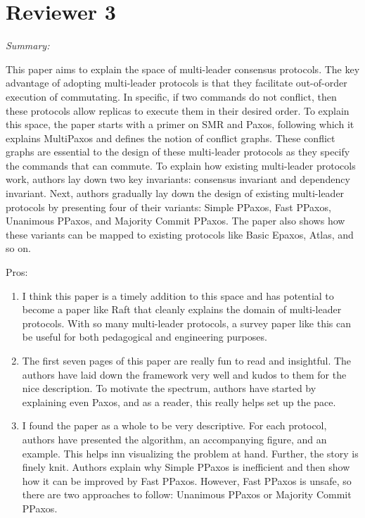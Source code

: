 \documentclass[letterpaper,twocolumn,10pt]{article}
\newenvironment{reviewerquote}
{\list{}{\leftmargin=\parindent\rightmargin=0in}\item[] \itshape \color{ReviewerDarkGray}}%
{\endlist}
\begin{document}
\section*{Reviewer 3}
\begin{reviewerquote}
  Summary:

  This paper aims to explain the space of multi-leader consensus protocols. The
  key advantage of adopting multi-leader protocols is that they facilitate
  out-of-order execution of commutating. In specific, if two commands do not
  conflict, then these protocols allow replicas to execute them in their
  desired order. To explain this space, the paper starts with a primer on SMR
  and Paxos, following which it explains MultiPaxos and defines the notion of
  conflict graphs. These conflict graphs are essential to the design of these
  multi-leader protocols as they specify the commands that can commute. To
  explain how existing multi-leader protocols work, authors lay down two key
  invariants: consensus invariant and dependency invariant. Next, authors
  gradually lay down the design of existing multi-leader protocols by
  presenting four of their variants: Simple PPaxos, Fast PPaxos, Unanimous
  PPaxos, and Majority Commit PPaxos. The paper also shows how these variants
  can be mapped to existing protocols like Basic Epaxos, Atlas, and so on.

  Pros:

  \begin{enumerate}
    \setcounter{enumi}{0}
    \item
      I think this paper is a timely addition to this space and has potential
      to become a paper like Raft that cleanly explains the domain of
      multi-leader protocols. With so many multi-leader protocols, a survey
      paper like this can be useful for both pedagogical and engineering
      purposes.
    \item
      The first seven pages of this paper are really fun to read and
      insightful. The authors have laid down the framework very well and kudos
      to them for the nice description. To motivate the spectrum, authors have
      started by explaining even Paxos, and as a reader, this really helps set
      up the pace.
    \item
      I found the paper as a whole to be very descriptive. For each protocol,
      authors have presented the algorithm, an accompanying figure, and an
      example. This helps inn visualizing the problem at hand. Further, the
      story is finely knit. Authors explain why Simple PPaxos is inefficient
      and then show how it can be improved by Fast PPaxos. However, Fast PPaxos
      is unsafe, so there are two approaches to follow: Unanimous PPaxos or
      Majority Commit PPaxos.
  \end{enumerate}


\end{reviewerquote}
\end{document}
